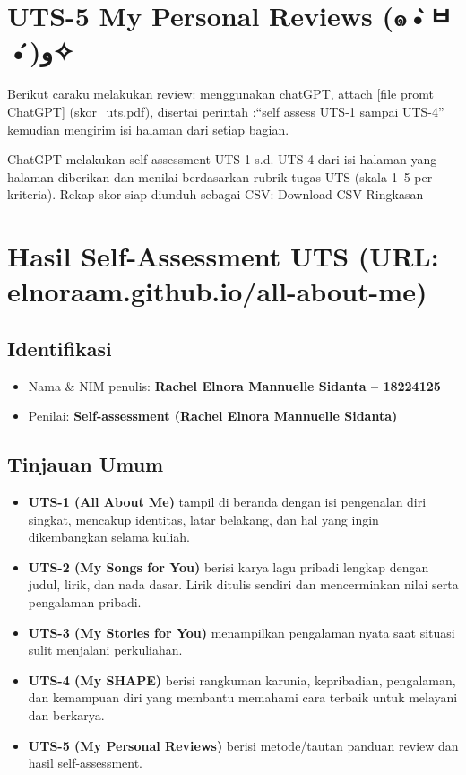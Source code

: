 \documentclass[
  letterpaper,
  DIV=11,
  numbers=noendperiod]{scrreprt}
\providecommand{\tightlist}{%
  \setlength{\itemsep}{0pt}\setlength{\parskip}{0pt}}
\begin{document}
\chapter{UTS-5 My Personal Reviews
(๑•̀ㅂ•́)و✧}\label{uts-5-my-personal-reviews-uxe51ux3142ux648}

Berikut caraku melakukan review: menggunakan chatGPT, attach {[}file
promt ChatGPT{]} (skor\_uts.pdf), disertai perintah :``self assess UTS-1
sampai UTS-4'' kemudian mengirim isi halaman dari setiap bagian.

ChatGPT melakukan self-assessment UTS-1 s.d. UTS-4 dari isi halaman yang
halaman diberikan dan menilai berdasarkan rubrik tugas UTS (skala 1--5
per kriteria). Rekap skor siap diunduh sebagai CSV: Download CSV
Ringkasan


\chapter{Hasil Self-Assessment UTS (URL:
elnoraam.github.io/all-about-me)}\label{hasil-self-assessment-uts-url-elnoraam.github.ioall-about-me}

\section{Identifikasi}\label{identifikasi}

\begin{itemize}
\tightlist
\item
  Nama \& NIM penulis: \textbf{Rachel Elnora Mannuelle Sidanta --
  18224125}
\item
  Penilai: \textbf{Self-assessment (Rachel Elnora Mannuelle Sidanta)}
\end{itemize}

\section{Tinjauan Umum}\label{tinjauan-umum}

\begin{itemize}
\tightlist
\item
  \textbf{UTS-1 (All About Me)} tampil di beranda dengan isi pengenalan
  diri singkat, mencakup identitas, latar belakang, dan hal yang ingin
  dikembangkan selama kuliah.
\item
  \textbf{UTS-2 (My Songs for You)} berisi karya lagu pribadi lengkap
  dengan judul, lirik, dan nada dasar. Lirik ditulis sendiri dan
  mencerminkan nilai serta pengalaman pribadi.
\item
  \textbf{UTS-3 (My Stories for You)} menampilkan pengalaman nyata saat
  situasi sulit menjalani perkuliahan.
\item
  \textbf{UTS-4 (My SHAPE)} berisi rangkuman karunia, kepribadian,
  pengalaman, dan kemampuan diri yang membantu memahami cara terbaik
  untuk melayani dan berkarya.
\item
  \textbf{UTS-5 (My Personal Reviews)} berisi metode/tautan panduan
  review dan hasil self-assessment.
\end{itemize}
\end{document}
